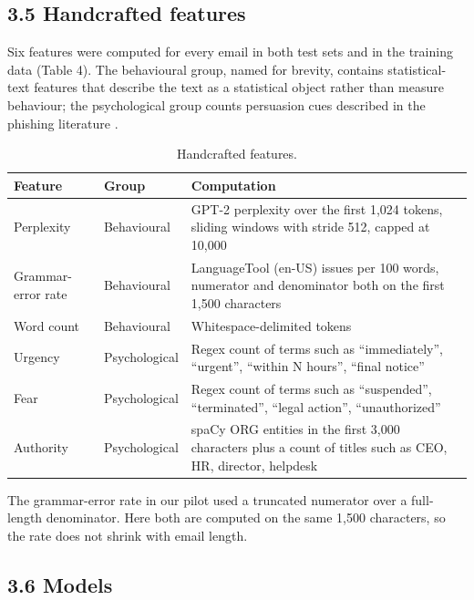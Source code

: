 \documentclass[11pt,letterpaper]{article}
\begin{document}
\subsection{3.5 Handcrafted features}

Six features were computed for every email in both test sets and in the training data (Table 4). The behavioural group, named for brevity, contains statistical-text features that describe the text as a statistical object rather than measure behaviour; the psychological group counts persuasion cues described in the phishing literature \cite{ferreira2015,cialdini2006influence}.

\begin{table}[!htbp]
\centering
\footnotesize
\caption{Handcrafted features.}
\begin{tabularx}{\linewidth}{YlY}
\toprule
\textbf{Feature} & \textbf{Group} & \textbf{Computation} \\
\midrule
Perplexity & Behavioural & GPT-2 \cite{radford2019language} perplexity over the first 1,024 tokens, sliding windows with stride 512, capped at 10,000 \\
Grammar-error rate & Behavioural & LanguageTool \cite{languagetool} (en-US) issues per 100 words, numerator and denominator both on the first 1,500 characters \\
Word count & Behavioural & Whitespace-delimited tokens \\
Urgency & Psychological & Regex count of terms such as ``immediately'', ``urgent'', ``within N hours'', ``final notice'' \\
Fear & Psychological & Regex count of terms such as ``suspended'', ``terminated'', ``legal action'', ``unauthorized'' \\
Authority & Psychological & spaCy \cite{honnibal2020spacy} ORG entities in the first 3,000 characters plus a count of titles such as CEO, HR, director, helpdesk \\
\bottomrule
\end{tabularx}
\end{table}

The grammar-error rate in our pilot used a truncated numerator over a full-length denominator. Here both are computed on the same 1,500 characters, so the rate does not shrink with email length.

\subsection{3.6 Models}
\end{document}
